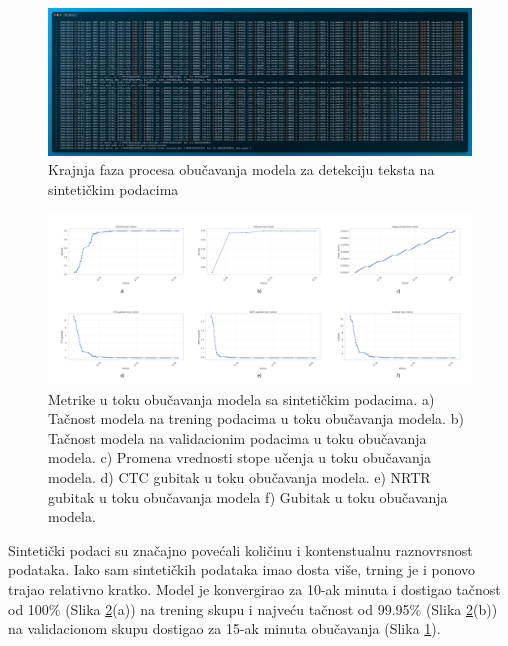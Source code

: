 \documentclass[a4paper,12pt]{article}
\begin{document}
	\begin{figure}[H]
		\centering
		\includegraphics[width=\textwidth]{assets/train-code-synthetic-data.png}
		\caption{Krajnja faza procesa obučavanja modela za detekciju teksta na sintetičkim podacima}
		\label{fig:train-code-synthetic-data}
	\end{figure}

	\begin{figure}[H]
		\centering
		\includegraphics[width=\textwidth]{assets/synthetic-data-metrics.png}
		\caption{Metrike u toku obučavanja modela sa sintetičkim podacima. a) Tačnost modela na trening podacima u toku obučavanja modela. b) Tačnost modela na validacionim podacima u toku obučavanja modela. c) Promena vrednosti stope učenja u toku obučavanja modela. d) CTC gubitak u toku obučavanja modela. e) NRTR gubitak u toku obučavanja modela f) Gubitak u toku obučavanja modela.}
		\label{fig:synthetic-data-metrics}
	\end{figure}
	
	Sintetički podaci su značajno povećali količinu i kontenstualnu raznovrsnost podataka. Iako sam sintetičkih podataka imao dosta više, trning je i ponovo trajao relativno kratko. Model je konvergirao za 10-ak minuta i dostigao tačnost od 100\% (Slika \ref{fig:synthetic-data-metrics}(a)) na trening skupu i najveću tačnost od 99.95\% (Slika \ref{fig:synthetic-data-metrics}(b)) na validacionom skupu dostigao za 15-ak minuta obučavanja (Slika \ref{fig:train-code-synthetic-data}).\newline
	
\end{document}
